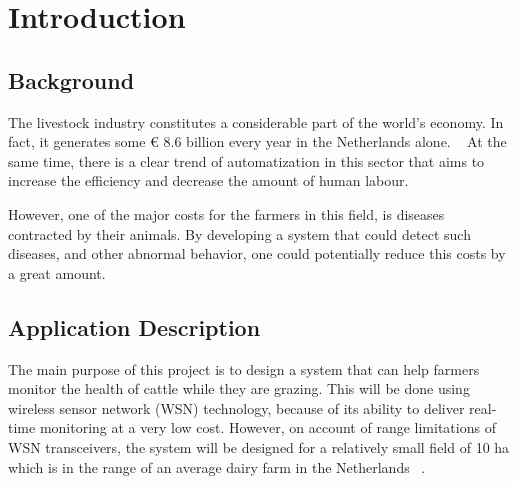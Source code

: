 \documentclass[conference]{IEEEtran}
\begin{document}




\maketitle

%
\IEEEpeerreviewmaketitle


\section{Introduction}

\subsection{Background}

The livestock industry constitutes a considerable part of the world’s economy.
In fact, it generates some € 8.6 billion every year in the Netherlands alone.
~\cite{ned_gov} At the same time, there is a clear trend of automatization in
this sector that aims to increase the efficiency and decrease the amount of
human labour.

However, one of the major costs for the farmers in this field, is diseases
contracted by their animals. By developing a system that could detect such
diseases, and other abnormal behavior, one could potentially reduce this costs
by a great amount.  


\subsection{Application Description}

The main purpose of this project is to design a system that can help farmers
monitor the health of cattle while they are grazing. This will be done using
wireless sensor network (WSN) technology, because of its ability to deliver
real-time monitoring at a very low cost.  However, on account of range
limitations of WSN transceivers, the system will be designed for a relatively
small field of 10 ha which is in the range of an average dairy farm in the
Netherlands ~\cite{agricultural_systems}.
\end{document}
